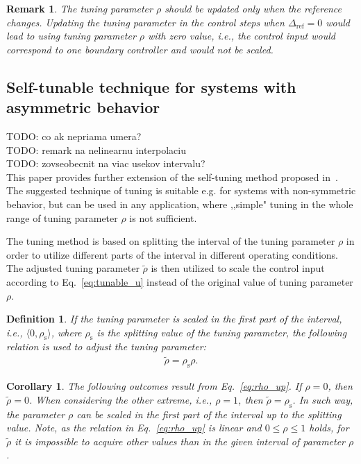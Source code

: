 \documentclass[preprint,12pt]{elsarticle}
\newtheorem{remark}[theorem]{Remark}
\newtheorem{corollary}{Corollary}[theorem]
\newtheorem{definition}{Definition}[section]
\begin{document}
\begin{remark}
	The tuning parameter $\rho$ should be updated only when the reference changes. Updating the tuning parameter in the control steps when $\Delta_{\mathrm{ref}} = 0$ would lead to using tuning parameter $\rho$ with zero value, i.e., the control input would correspond to one boundary controller and would not be scaled.
\end{remark}


\subsection{Self-tunable technique for systems with asymmetric behavior}
\label{sec:self_tunable_rho_scaling}
\noindent TODO: co ak nepriama umera? \\
TODO: remark na nelinearnu interpolaciu \\
TODO: zovseobecnit na viac usekov intervalu? \\

This paper provides further extension of the self-tuning method proposed in~\cite{self_tunable}. The suggested technique of tuning is suitable e.g. for systems with non-symmetric behavior, but can be used in any application, where ,,simple" tuning in the whole range of tuning parameter $\rho$ is not sufficient.

The tuning method is based on splitting the interval of the tuning parameter $\rho$ in order to utilize different parts of the interval in different operating conditions. The adjusted tuning parameter $\widetilde{\rho}$ is then utilized to scale the control input according to Eq.~\eqref{eq:tunable_u} instead of the original value of tuning parameter $\rho$.     

\begin{definition}
	If the tuning parameter is scaled in the first part of the interval, i.e., $\langle 0, \rho_{\mathrm{s}} \rangle$, where $\rho_{\mathrm{s}}$ is the splitting value of the tuning parameter, the following relation is used to adjust the tuning parameter:
	\begin{eqnarray}
		\label{eq:rho_up}
		\widetilde{\rho} = \rho_{\mathrm{s}} \rho.
	\end{eqnarray}
\end{definition}

\begin{corollary}
	The following outcomes result from Eq.~\eqref{eq:rho_up}. If $\rho=0$, then $\widetilde{\rho} = 0$. When considering the other extreme, i.e., $\rho=1$, then $\widetilde{\rho} = \rho_{\mathrm{s}}$. In such way, the parameter $\rho$ can be scaled in the first part of the interval up to the splitting value. Note, as the relation in Eq.~\eqref{eq:rho_up} is linear and $0 \le \rho \le 1$ holds, for $\widetilde{\rho}$ it is impossible to acquire other values than in the given interval of parameter $\rho$.   
\end{corollary}
\end{document}

